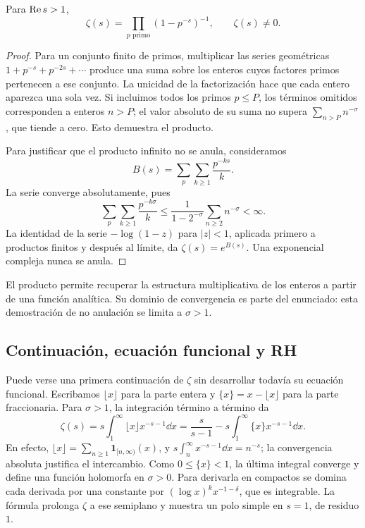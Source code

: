 \begin{proposicion}
Para $\operatorname{Re} s>1$,
\begin{equation}
 \zeta(s)=\prod_{p\text{ primo}}(1-p^{-s})^{-1},
 \qquad \zeta(s)\ne0.
 \label{eq:intro-euler}
\end{equation}
\end{proposicion}
\begin{proof}
Para un conjunto finito de primos, multiplicar las series geométricas
$1+p^{-s}+p^{-2s}+\cdots$ produce una suma sobre los enteros cuyos
factores primos pertenecen a ese conjunto. La unicidad de la factorización
hace que cada entero aparezca una sola vez. Si incluimos todos los primos
$p\le P$, los términos omitidos corresponden a enteros $n>P$; el valor
absoluto de su suma no supera $\sum_{n>P}n^{-\sigma}$, que tiende a cero.
Esto demuestra el producto.

Para justificar que el producto infinito no se anula, consideramos
\[
 B(s)=\sum_p\sum_{k\ge1}\frac{p^{-ks}}{k}.
\]
La serie converge absolutamente, pues
\[
 \sum_p\sum_{k\ge1}\frac{p^{-k\sigma}}{k}
 \le\frac{1}{1-2^{-\sigma}}\sum_{n\ge2}n^{-\sigma}<\infty.
\]
La identidad de la serie $-\log(1-z)$ para $|z|<1$, aplicada primero a
productos finitos y después al límite, da $\zeta(s)=e^{B(s)}$.
Una exponencial compleja nunca se anula.
\end{proof}

El producto permite recuperar la estructura multiplicativa de los enteros
a partir de una función analítica. Su dominio de convergencia es parte del
enunciado: esta demostración de no anulación se limita a $\sigma>1$.

\subsection{Continuación, ecuación funcional y RH}

Puede verse una primera continuación de $\zeta$ sin desarrollar todavía
su ecuación funcional. Escribamos $\lfloor x\rfloor$ para la parte entera
y $\{x\}=x-\lfloor x\rfloor$ para la parte fraccionaria. Para $\sigma>1$,
la integración término a término da
\[
 \zeta(s)=s\int_1^\infty\lfloor x\rfloor x^{-s-1}\dd x
 =\frac{s}{s-1}-s\int_1^\infty\{x\}x^{-s-1}\dd x.
\]
En efecto, $\lfloor x\rfloor=\sum_{n\ge1}\mathbf1_{[n,\infty)}(x)$,
y $s\int_n^\infty x^{-s-1}\dd x=n^{-s}$; la convergencia absoluta
justifica el intercambio. Como $0\le\{x\}<1$, la última integral converge
y define una función holomorfa en $\sigma>0$. Para derivarla en compactos
se domina cada derivada por una constante por
$(\log x)^k x^{-1-\delta}$, que es integrable. La fórmula prolonga
$\zeta$ a ese semiplano y muestra un polo simple en $s=1$, de residuo $1$.

